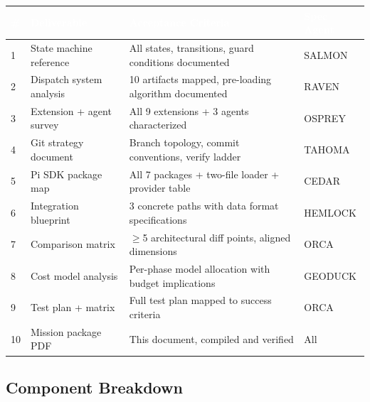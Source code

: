 \documentclass[11pt,letterpaper]{article}
\newcommand{\tableheader}[1]{\textbf{\sffamily\textcolor{white}{#1}}}
\begin{document}
\begin{center}
\begin{tabularx}{\textwidth}{C{0.5cm}L{4cm}L{4cm}X}
\toprule
{}
\tableheader{\#} & \tableheader{Deliverable} & \tableheader{Acceptance Criteria} & \tableheader{Spec Agent} \\
 & State machine reference & All states, transitions, guard conditions documented & SALMON \\
2 & Dispatch system analysis & 10 artifacts mapped, pre-loading algorithm documented & RAVEN \\
3 & Extension + agent survey & All 9 extensions + 3 agents characterized & OSPREY \\
4 & Git strategy document & Branch topology, commit conventions, verify ladder & TAHOMA \\
5 & Pi SDK package map & All 7 packages + two-file loader + provider table & CEDAR \\
6 & Integration blueprint & 3 concrete paths with data format specifications & HEMLOCK \\
7 & Comparison matrix & $\geq$5 architectural diff points, aligned dimensions & ORCA \\
8 & Cost model analysis & Per-phase model allocation with budget implications & GEODUCK \\
9 & Test plan + matrix & Full test plan mapped to success criteria & ORCA \\
10 & Mission package PDF & This document, compiled and verified & All \\
\bottomrule
\end{tabularx}
\end{center}

\subsection{Component Breakdown}
\end{document}
